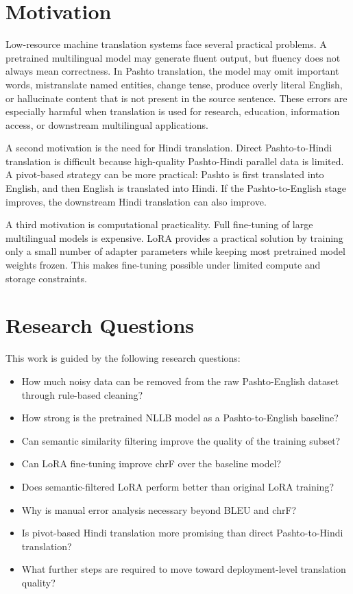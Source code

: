 \documentclass[conference]{IEEEtran}
\begin{document}
\section{Motivation}

Low-resource machine translation systems face several practical problems. A pretrained multilingual model may generate fluent output, but fluency does not always mean correctness. In Pashto translation, the model may omit important words, mistranslate named entities, change tense, produce overly literal English, or hallucinate content that is not present in the source sentence. These errors are especially harmful when translation is used for research, education, information access, or downstream multilingual applications.

A second motivation is the need for Hindi translation. Direct Pashto-to-Hindi translation is difficult because high-quality Pashto-Hindi parallel data is limited. A pivot-based strategy can be more practical: Pashto is first translated into English, and then English is translated into Hindi. If the Pashto-to-English stage improves, the downstream Hindi translation can also improve.

A third motivation is computational practicality. Full fine-tuning of large multilingual models is expensive. LoRA provides a practical solution by training only a small number of adapter parameters while keeping most pretrained model weights frozen. This makes fine-tuning possible under limited compute and storage constraints.

\section{Research Questions}

This work is guided by the following research questions:

\begin{itemize}
    \item How much noisy data can be removed from the raw Pashto-English dataset through rule-based cleaning?
    \item How strong is the pretrained NLLB model as a Pashto-to-English baseline?
    \item Can semantic similarity filtering improve the quality of the training subset?
    \item Can LoRA fine-tuning improve chrF over the baseline model?
    \item Does semantic-filtered LoRA perform better than original LoRA training?
    \item Why is manual error analysis necessary beyond BLEU and chrF?
    \item Is pivot-based Hindi translation more promising than direct Pashto-to-Hindi translation?
    \item What further steps are required to move toward deployment-level translation quality?
\end{itemize}
\end{document}
